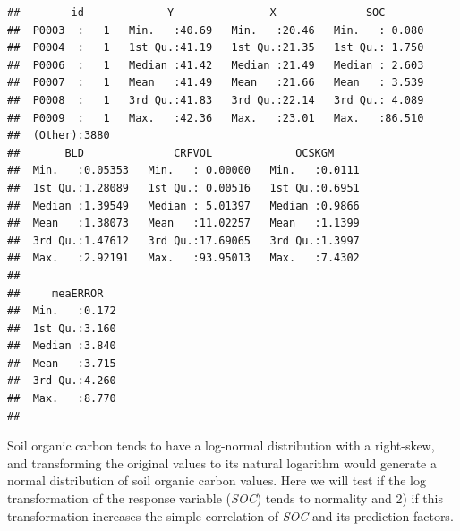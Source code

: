 \documentclass[10pt,b5paper,]{book}
\newenvironment{Shaded}{\begin{snugshade}}{\end{snugshade}}
\newcommand{\CommentTok}[1]{\textcolor[rgb]{0.56,0.35,0.01}{\textit{#1}}}
\newcommand{\DataTypeTok}[1]{\textcolor[rgb]{0.13,0.29,0.53}{#1}}
\newcommand{\DecValTok}[1]{\textcolor[rgb]{0.00,0.00,0.81}{#1}}
\newcommand{\KeywordTok}[1]{\textcolor[rgb]{0.13,0.29,0.53}{\textbf{#1}}}
\newcommand{\NormalTok}[1]{#1}
\newcommand{\OperatorTok}[1]{\textcolor[rgb]{0.81,0.36,0.00}{\textbf{#1}}}
\newcommand{\StringTok}[1]{\textcolor[rgb]{0.31,0.60,0.02}{#1}}
\theoremstyle{definition}
\theoremstyle{definition}
\theoremstyle{definition}
\theoremstyle{remark}
\begin{document}
\begin{verbatim}
##        id             Y               X              SOC        
##  P0003  :   1   Min.   :40.69   Min.   :20.46   Min.   : 0.080  
##  P0004  :   1   1st Qu.:41.19   1st Qu.:21.35   1st Qu.: 1.750  
##  P0006  :   1   Median :41.42   Median :21.49   Median : 2.603  
##  P0007  :   1   Mean   :41.49   Mean   :21.66   Mean   : 3.539  
##  P0008  :   1   3rd Qu.:41.83   3rd Qu.:22.14   3rd Qu.: 4.089  
##  P0009  :   1   Max.   :42.36   Max.   :23.01   Max.   :86.510  
##  (Other):3880                                                   
##       BLD              CRFVOL             OCSKGM      
##  Min.   :0.05353   Min.   : 0.00000   Min.   :0.0111  
##  1st Qu.:1.28089   1st Qu.: 0.00516   1st Qu.:0.6951  
##  Median :1.39549   Median : 5.01397   Median :0.9866  
##  Mean   :1.38073   Mean   :11.02257   Mean   :1.1399  
##  3rd Qu.:1.47612   3rd Qu.:17.69065   3rd Qu.:1.3997  
##  Max.   :2.92191   Max.   :93.95013   Max.   :7.4302  
##                                                       
##     meaERROR    
##  Min.   :0.172  
##  1st Qu.:3.160  
##  Median :3.840  
##  Mean   :3.715  
##  3rd Qu.:4.260  
##  Max.   :8.770  
## 
\end{verbatim}

Soil organic carbon tends to have a log-normal distribution with a
right-skew, and transforming the original values to its natural
logarithm would generate a normal distribution of soil organic carbon
values. Here we will test if the log transformation of the response
variable (\emph{SOC}) tends to normality and 2) if this transformation
increases the simple correlation of \emph{SOC} and its prediction
factors.

\begin{Shaded}
\end{Shaded}
\end{document}
